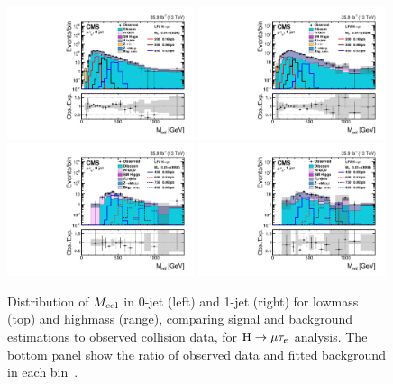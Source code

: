 \begin{figure}[!htpb]\centering
   \captionsetup{width=.98\textwidth,justification=centering}
 \includegraphics[width=0.49\textwidth]{plots_and_figures/chapter8/highmass/log_low_me_ch1_HMuTau_mutaue_1_2016_postfit_colmass_postfit.pdf}
 \includegraphics[width=0.49\textwidth]{plots_and_figures/chapter8/highmass/log_low_me_ch1_HMuTau_mutaue_2_2016_postfit_colmass_postfit.pdf} \\
 \includegraphics[width=0.49\textwidth]{plots_and_figures/chapter8/highmass/log_high_me_ch1_HMuTau_mutaue_1_2016_postfit_colmass_postfit.pdf}
 \includegraphics[width=0.49\textwidth]{plots_and_figures/chapter8/highmass/log_high_me_ch1_HMuTau_mutaue_2_2016_postfit_colmass_postfit.pdf} 
\caption{Distribution of $M_{\text{col}}$ in 0-jet (left) and 1-jet (right) for lowmass (top) and highmass (range), comparing signal and background estimations to observed collision data, for $\text{H} \to \mu \tau_{e}$ analysis. The bottom panel show the ratio of observed data and fitted background in each bin~\cite{HIG-18-017}.}
 \label{fig:mcol_dist_Hmue}
\end{figure}


